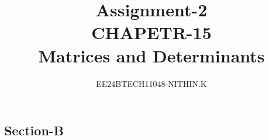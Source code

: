\documentclass[journal,12pt,twocolumn]{IEEEtran}
\theoremstyle{remark}
\begin{document}


\title{Assignment-2 \\ CHAPETR-15 \\ Matrices and Determinants}
\author{EE24BTECH11048-NITHIN.K} 
\maketitle
\newpage
\bigskip

\renewcommand{\thefigure}{\theenumi}
\renewcommand{\thetable}{\theenumi}
\begin{enumerate}

\section{Section-B}


\end{enumerate}
\end{document}
